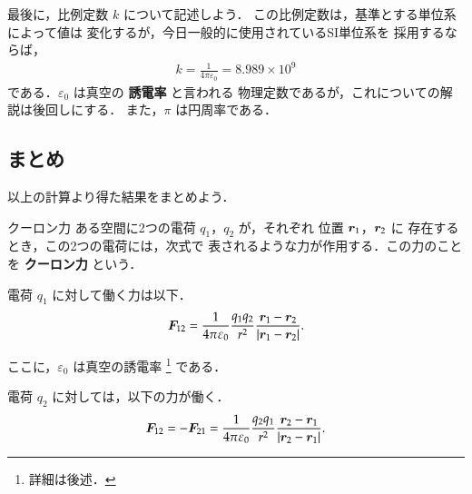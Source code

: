         最後に，比例定数 $k$ について記述しよう．
        この比例定数は，基準とする単位系によって値は
        変化するが，今日一般的に使用されているSI単位系を
        採用するならば，
            \begin{align}
                k = \frac{1}{4\pi\varepsilon_{0}} = 8.989 \times 10^{9}
            \end{align}
        である．$\varepsilon_{0}$ は真空の \textbf{誘電率} と言われる
        物理定数であるが，これについての解説は後回しにする．
        また，$\pi$ は円周率である．

    \subsection{まとめ}
        以上の計算より得た結果をまとめよう．
        \begin{myshadebox}{クーロン力}
            ある空間に2つの電荷 $q_{1}$，$q_{2}$ が，それぞれ
            位置 $\boldsymbol{r}_{1}$，$\boldsymbol{r}_{2}$ に
            存在するとき，この2つの電荷には，次式で
            表されるような力が作用する．この力のこと
            を \textbf{クーロン力} という．

            電荷 $q_{1}$ に対して働く力は以下．
               \begin{align}
                   \boldsymbol{F}_{12} =
                       \frac{1}{4\pi\varepsilon_{0}} \frac{q_{1}q_{2}}{r^{2}}
                           \frac{\boldsymbol{r}_{1} - \boldsymbol{r}_{2}}{|\boldsymbol{r}_{1} - \boldsymbol{r}_{2}|}.
               \end{align}

        ここに，$\varepsilon_{0}$ は真空の誘電率
           \footnote{
               詳細は後述．
           }
        である．
        \end{myshadebox}


        電荷 $q_{2}$ に対しては，以下の力が働く．
           \begin{align}
               \boldsymbol{F}_{12} = -\boldsymbol{F}_{21} =
                   \frac{1}{4\pi\varepsilon_{0}} \frac{q_{2}q_{1}}{r^{2}}
                       \frac{\boldsymbol{r}_{2} - \boldsymbol{r}_{1}}{|\boldsymbol{r}_{2} - \boldsymbol{r}_{1}|}.
           \end{align}


